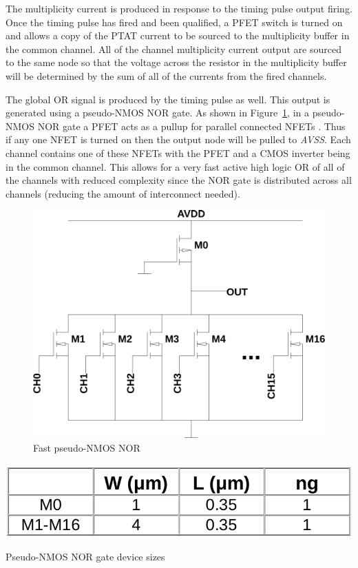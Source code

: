 \documentclass[12pt,oneside,final]{siuethesis}
\theoremstyle{definition}
\begin{document}
\par The multiplicity current is produced in response to the timing pulse output firing. Once the timing pulse has fired and been qualified, a PFET switch is turned on and allows a copy of the PTAT current to be sourced to the multiplicity buffer in the common channel. All of the channel multiplicity current output are sourced to the same node so that the voltage across the resistor in the multiplicity buffer will be determined by the sum of all of the currents from the fired channels. 
\par The global OR signal is produced by the timing pulse as well. This output is generated using a pseudo-NMOS NOR gate. As shown in Figure~\ref{fig:pseudo-nmos}, in a pseudo-NMOS NOR gate a PFET acts as a pullup for parallel connected NFETs \cite{WESTE}. Thus if any one NFET is turned on then the output node will be pulled to \emph{AVSS}. Each channel contains one of these NFETs with the PFET and a CMOS inverter being in the common channel. This allows for a very fast active high logic OR of all of the channels with reduced complexity since the NOR gate is distributed across all channels (reducing the amount of interconnect needed).

\begin{figure}[htbp!]
 \centering
 \includegraphics[scale=.45,keepaspectratio=true]{../LTspice_Drawings/pseudo-nmos/pseudo-nmos.png}
 \caption{Fast pseudo-NMOS NOR}
 \label{fig:pseudo-nmos}
\end{figure}

\begin{table}[htbp!]
 \centering
 \includegraphics[scale=.35,keepaspectratio=true]{./ch3_figures/nor_sizes.png}
 \caption{Pseudo-NMOS NOR gate device sizes}
 \label{tab:nor-sizes}
\end{table}
\end{document}
